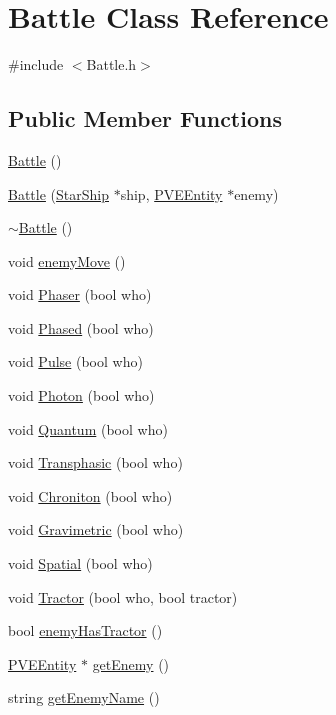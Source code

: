 \hypertarget{classBattle}{
\section{Battle Class Reference}
\label{dd/dfd/classBattle}
}


{\ttfamily \#include $<$Battle.h$>$}

\subsection*{Public Member Functions}
\begin{DoxyCompactItemize}
\item 
\hyperlink{classBattle_abecc253b23b71da260445e4bdc8522e2}{Battle} ()
\item 
\hyperlink{classBattle_a46d700ea31d3be9e3c2b7f58a361490e}{Battle} (\hyperlink{classStarShip}{StarShip} $\ast$ship, \hyperlink{classPVEEntity}{PVEEntity} $\ast$enemy)
\item 
\hyperlink{classBattle_ae44141e587836ba84243cad46b17c228}{$\sim$Battle} ()
\item 
void \hyperlink{classBattle_a21c7d3fe2b8f8acdcf52d7dc03ee0845}{enemyMove} ()
\item 
void \hyperlink{classBattle_ac47c4c6769ba4c285b6b3bce196665f7}{Phaser} (bool who)
\item 
void \hyperlink{classBattle_af93833dc6f45a9a9b57b3fd0a98c7b53}{Phased} (bool who)
\item 
void \hyperlink{classBattle_abb853e7323e8c06115d261476eb60da6}{Pulse} (bool who)
\item 
void \hyperlink{classBattle_a4e3b6df23a451e85b0bd078e4a5692fa}{Photon} (bool who)
\item 
void \hyperlink{classBattle_ab146205ff35979b462ee057f3dedf84c}{Quantum} (bool who)
\item 
void \hyperlink{classBattle_a291ea216c6a4a576c9cd287ddf5afb89}{Transphasic} (bool who)
\item 
void \hyperlink{classBattle_ac27cb8ae9cc2220d90446de6d5c2a03e}{Chroniton} (bool who)
\item 
void \hyperlink{classBattle_a59fbad01d3da6683a902601dee2a244c}{Gravimetric} (bool who)
\item 
void \hyperlink{classBattle_af3866096de0e01ea273b211d0babaade}{Spatial} (bool who)
\item 
void \hyperlink{classBattle_a36916b73287143368e13759da9a64842}{Tractor} (bool who, bool tractor)
\item 
bool \hyperlink{classBattle_a4c6da8cc9af5dd34901c18a9d54ea139}{enemyHasTractor} ()
\item 
\hyperlink{classPVEEntity}{PVEEntity} $\ast$ \hyperlink{classBattle_aafeb9f025d6d77ba8a58a3fbd386c039}{getEnemy} ()
\item 
string \hyperlink{classBattle_a5d850d794776aac6b7d742f3385ce82a}{getEnemyName} ()
\end{DoxyCompactItemize}


